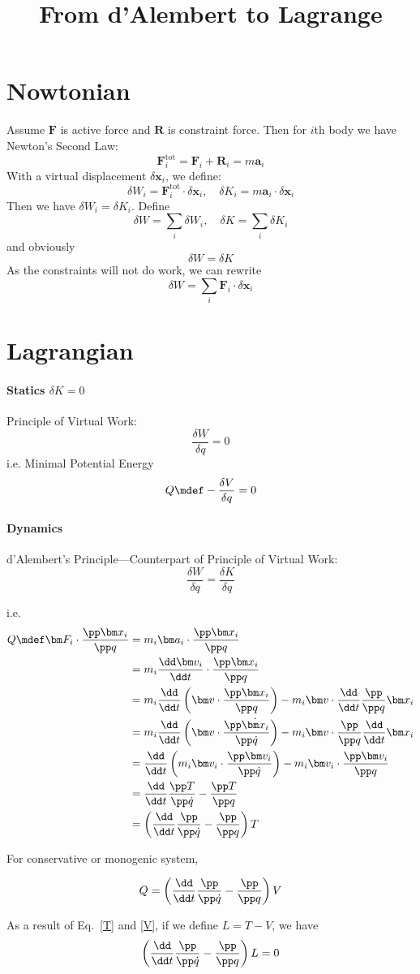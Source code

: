 \documentclass[12pt]{article}
\title{From d'Alembert to Lagrange}
\author{\zpj}
\begin{document}
\maketitle
\section{Nowtonian}
Assume $\bm F$ is active force and $\bm R$ is constraint force. Then for $i$th body we have Newton's Second Law:
\[\bm F^\mathrm{tot}_i=\bm F_i+\bm R_i=m\bm a_i\]
With a virtual displacement $\delta \bm x_i$, we define:
\[\delta W_i=\bm F^\mathrm{tot}_i\cdot\delta\bm x_i,\quad
\delta K_i=m\bm a_i\cdot\delta\bm x_i\]
Then we have $\delta W_i=\delta K_i$. Define
\[\delta W=\sum_i\delta W_i,\quad\delta K=\sum_i\delta K_i\]
and obviously\[\delta W=\delta K\]
As the constraints will not do work, we can rewrite
\[\delta W=\sum_i\bm F_i\cdot\delta\bm x_i\]
\section{Lagrangian}
\paragraph{Statics $\delta K=0$}
Principle of Virtual Work:
\[\frac{\delta W}{\delta q}=0\]
i.e. Minimal Potential Energy
\[Q\mdef-\frac{\delta V}{\delta q}=0\]
\paragraph{Dynamics}

d'Alembert's Principle---Counterpart of Principle of Virtual Work:
\[\frac{\delta W}{\delta q}=\frac{\delta K}{\delta q}\]

i.e. 
\begin{align}
Q\mdef\bm F_i\cdot\frac{\pp \bm x_i}{\pp q}&=m_i\bm a_i\cdot\frac{\pp \bm x_i}{\pp q}\\
&=m_i\frac{\dd \bm v_i}{\dd t}\cdot\frac{\pp \bm x_i}{\pp q}\\
&=m_i\frac{\dd}{\dd t}\left( \bm v\cdot\frac{\pp \bm x_i}{\pp q}\right)-m_i\bm v\cdot\frac{\dd}{\dd t}\frac{\pp}{\pp q}\bm x_i\\
&=m_i\frac{\dd}{\dd t}\left(\bm v\cdot\frac{\pp \dot{\bm x_i}}{\pp\dot q}\right)-m_i\bm v\cdot\frac{\pp}{\pp q}\frac{\dd}{\dd t}\bm x_i\\
&=\frac{\dd}{\dd t}\left(m_i\bm v_i\cdot\frac{\pp\bm v_i}{\pp\dot q}\right)-m_i\bm v_i\cdot\frac{\pp \bm v_i}{\pp q}\\
&=\frac{\dd}{\dd t}\frac{\pp T}{\pp\dot q}-\frac{\pp T}{\pp q}\\
&=\left(\frac{\dd}{\dd t}\frac{\pp}{\pp\dot q}-\frac{\pp}{\pp q}\right)T\label{T}
\end{align}

For conservative or monogenic system,

\begin{equation}
Q=\left(\frac{\dd}{\dd t}\frac{\pp}{\pp\dot q}-\frac{\pp}{\pp q}\right)V\label{V}
\end{equation}

As a result of Eq.~\ref{T} and \ref{V}, if we define $L=T-V$, we have
\[\left(\frac{\dd}{\dd t}\frac{\pp}{\pp\dot q}-\frac{\pp}{\pp q}\right)L=0\]
\end{document}

